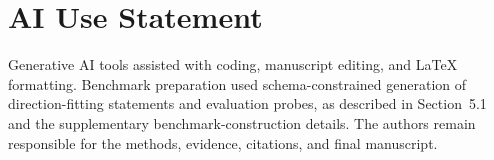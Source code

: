 \section*{AI Use Statement}
Generative AI tools assisted with coding, manuscript editing, and LaTeX
formatting. Benchmark preparation used schema-constrained generation of
direction-fitting statements and evaluation probes, as described in
Section~5.1 and the supplementary benchmark-construction details. The authors
remain responsible for the methods, evidence, citations, and final manuscript.
